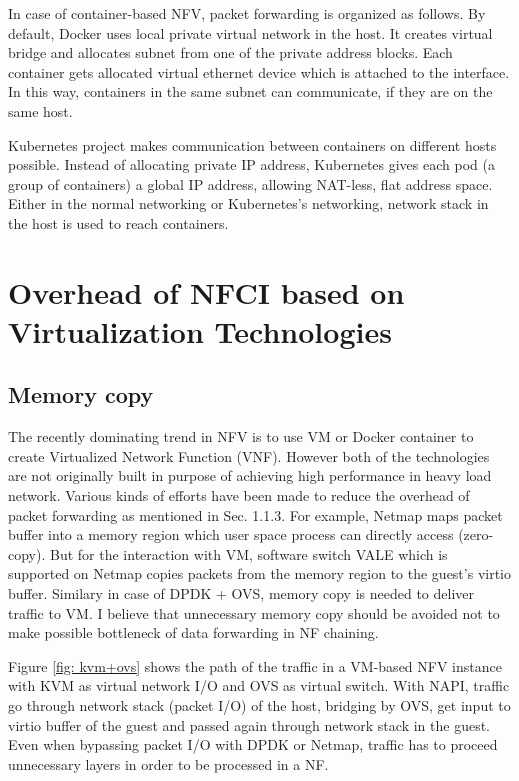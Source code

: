 In case of container-based NFV, packet forwarding is organized as follows. 
By default, Docker uses local private virtual network in the host. It creates virtual bridge and allocates subnet from one of the private address blocks. Each container gets allocated virtual ethernet device which is attached to the interface. In this way, containers in the same subnet can communicate, if they are on the same host. 

Kubernetes project\cite{Kubernetes} makes communication between containers on different hosts possible. Instead of allocating private IP address, Kubernetes gives each pod (a group of containers) a global IP address, allowing NAT-less, flat address space. Either in the normal networking or Kubernetes's networking, network stack in the host is used to reach containers. 

\section{Overhead of NFCI based on Virtualization Technologies}
\subsection{Memory copy}
The recently dominating trend in NFV is to use VM or Docker container to create Virtualized Network Function (VNF). However both of the technologies are not originally built in purpose of achieving high performance in heavy load network. 
Various kinds of efforts have been made to reduce the overhead of packet forwarding as mentioned in Sec. 1.1.3. For example, Netmap maps packet buffer into a memory region which user space process can directly access (zero-copy). But for the interaction with VM, software switch VALE\cite{VALE} which is supported on Netmap copies packets from the memory region to the guest's virtio buffer. Similary in case of DPDK + OVS, memory copy is needed to deliver traffic to VM. I believe that unnecessary memory copy should be avoided not to make possible bottleneck of data forwarding in NF chaining. 

Figure \ref{fig: kvm+ovs} shows the path of the traffic in a VM-based NFV instance with KVM as virtual network I/O and OVS as virtual switch. With NAPI, traffic go through network stack (packet I/O) of the host, bridging by OVS, get input to virtio buffer of the guest and passed again through network stack in the guest. Even when bypassing packet I/O with DPDK or Netmap, traffic has to proceed unnecessary layers in order to be processed in a NF. 

